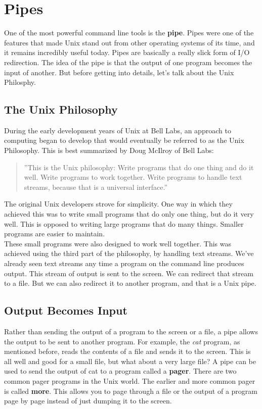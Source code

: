\section{Pipes}

One of the most powerful command line tools is the \textbf{pipe}.  Pipes were one of the features that made Unix stand out from other operating systems of its time, and it remains incredibly useful today.  Pipes are basically a really slick form of I/O redirection.  The idea of the pipe is that the output of one program becomes the input of another.  But before getting into details, let's talk about the Unix Philosphy.

\subsection{The Unix Philosophy}

During the early development years of Unix at Bell Labs, an approach to computing began to develop that would eventually be referred to as the Unix Philosophy.  This is best summarized by Doug McIlroy of Bell Labs:

\begin{quote}
''This is the Unix philosophy: Write programs that do one thing and do it well. Write programs to work together. Write programs to handle text streams, because that is a universal interface.''
\end{quote}

The original Unix developers strove for simplicity.  One way in which they achieved this was to write small programs that do only one thing, but do it very well.  This is opposed to writing large programs that do many things.  Smaller programs are easier to maintain.\\

These small programs were also designed to work well together.  This was achieved using the third part of the philosophy, by handling text streams.  We've already seen text streams any time a program on the command line produces output.  This stream of output is sent to the screen.  We can redirect that stream to a file.  But we can also redirect it to another program, and that is a Unix pipe.

\subsection{Output Becomes Input}

Rather than sending the output of a program to the screen or a file, a pipe allows the output to be sent to another program.  For example, the \textit{cat} program, as mentioned before, reads the contents of a file and sends it to the screen.  This is all well and good for a small file, but what about a very large file?  A pipe can be used to send the output of cat to a program called a \textbf{pager}.  There are two common pager programs in the Unix world.  The earlier and more common pager is called \textbf{more}.  This allows you to page through a file or the output of a program page by page instead of just dumping it to the screen.\\

